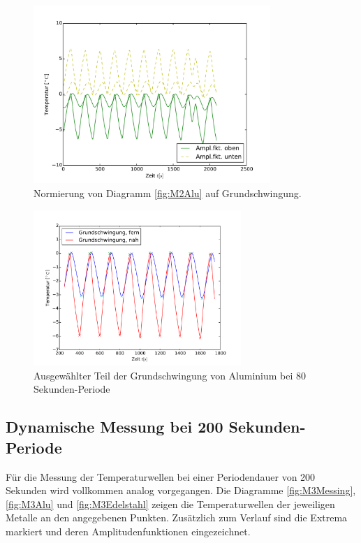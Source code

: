 \begin{figure}[h!]
	\centering
	\includegraphics[width=0.8\textwidth]{Bilder/Normierungsauswahl/M2_Messing_norm.pdf}
	\caption{Normierung von Diagramm \ref{fig:M2Alu} auf Grundschwingung.}
	\label{fig:M2AluNorm}
\end{figure}
\begin{figure}[h!]
	\centering
	\includegraphics[width=0.7\textwidth]{Bilder/M2_Alu_norm.pdf}
	\caption{Ausgewählter Teil der Grundschwingung von Aluminium bei 80 Sekunden-Periode}
	\label{fig:M2AluNormkurve}
\end{figure}

\subsection{Dynamische Messung bei 200 Sekunden-Periode}
Für die Messung der Temperaturwellen bei einer Periodendauer von 200 Sekunden wird vollkommen analog vorgegangen.
Die Diagramme \ref{fig:M3Messing}, \ref{fig:M3Alu} und \ref{fig:M3Edelstahl} zeigen die Temperaturwellen der jeweiligen Metalle an den angegebenen Punkten. 
Zusätzlich zum Verlauf sind die Extrema markiert und deren Amplitudenfunktionen eingezeichnet.

